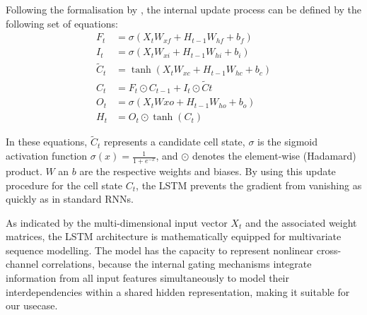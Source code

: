      Following the formalisation by \textcite{gentleschmidt2019recurrentneuralnetworksrnns}, the internal update process can be defined by the following set of equations:
     \begin{align}
         F_t &= \sigma(X_t W_{xf} + H_{t-1} W_{hf} + b_f) \\%
         I_t &= \sigma(X_t W_{xi} + H_{t-1} W_{hi} + b_i) \\%
         \tilde{C}_t &= \tanh(X_t W_{xc} + H_{t-1} W_{hc} + b_c) \\%
         C_t &= F_t \odot C_{t-1} + I_t \odot \tilde{C}t \\ %
         O_t &= \sigma(X_t W{xo} + H_{t-1} W_{ho} + b_o) \\ %
         H_t &= O_t \odot \tanh(C_t)
     \end{align}
     
     In these equations, $\tilde{C}_t$ represents a candidate cell state, $\sigma$ is the sigmoid activation function $\sigma(x) = \frac{1}{1 + e^{-x}}$, and $\odot$ denotes the element-wise (Hadamard) product. $W$ an $b$ are the respective weights and biases. %
     By using this update procedure for the cell state $C_t$, the \ac{LSTM} prevents the gradient from vanishing as quickly as in standard \acp{RNN}.%

     As indicated by the multi-dimensional input vector $X_t$ and the associated weight matrices, the \ac{LSTM} architecture is mathematically equipped for multivariate sequence modelling. The model has the capacity to represent nonlinear cross-channel correlations, because the internal gating mechanisms integrate information from all input features simultaneously to model their interdependencies within a shared hidden representation, making it suitable for our usecase. 
    

